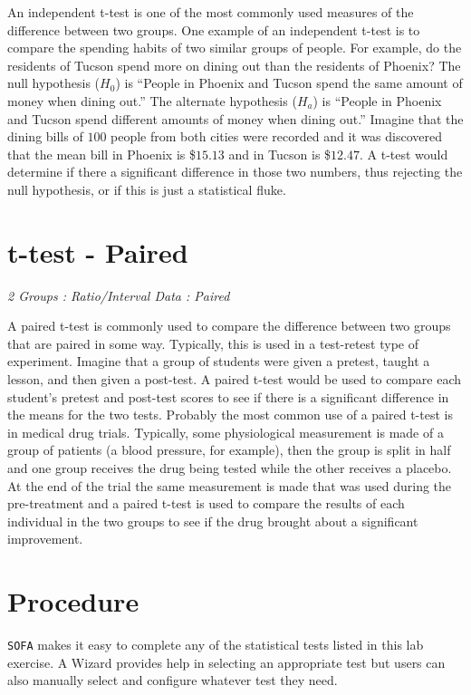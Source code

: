 An independent t-test is one of the most commonly used measures of the difference between two groups. One example of an independent t-test is to compare the spending habits of two similar groups of people. For example, do the residents of Tucson spend more on dining out than the residents of Phoenix? The null hypothesis ($ H_{0} $) is ``People in Phoenix and Tucson spend the same amount of money when dining out.'' The alternate hypothesis ($ H_{a} $) is ``People in Phoenix and Tucson spend different amounts of money when dining out.'' Imagine that the dining bills of $ 100 $ people from both cities were recorded and it was discovered that the mean bill in Phoenix is \$$ 15.13 $ and in Tucson is \$$ 12.47 $. A t-test would determine if there a significant difference in those two numbers, thus rejecting the null hypothesis, or if this is just a statistical fluke.

\section{t-test - Paired}

\textit{2 Groups : Ratio/Interval Data : Paired}

A paired t-test is commonly used to compare the difference between two groups that are paired in some way. Typically, this is used in a test-retest type of experiment. Imagine that a group of students were given a pretest, taught a lesson, and then given a post-test. A paired t-test would be used to compare each student's pretest and post-test scores to see if there is a significant difference in the means for the two tests. Probably the most common use of a paired t-test is in medical drug trials. Typically, some physiological measurement is made of a group of patients (a blood pressure, for example), then the group is split in half and one group receives the drug being tested while the other receives a placebo. At the end of the trial the same measurement is made that was used during the pre-treatment and a paired t-test is used to compare the results of each individual in the two groups to see if the drug brought about a significant improvement.

\section{Procedure}

\texttt{SOFA} makes it easy to complete any of the statistical tests listed in this lab exercise. A Wizard provides help in selecting an appropriate test but users can also manually select and configure whatever test they need.


